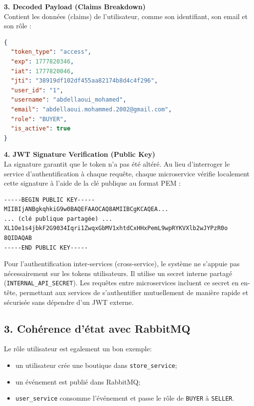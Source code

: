 \documentclass[11pt,a4paper]{article}
\begin{document}
\noindent\textbf{3. Decoded Payload (Claims Breakdown)} \\
Contient les données (claims) de l'utilisateur, comme son identifiant, son email et son rôle :
\begin{lstlisting}[language=json]
{
  "token_type": "access",
  "exp": 1777820346,
  "iat": 1777820046,
  "jti": "38919df102df455aa82174b8d4c4f296",
  "user_id": "1",
  "username": "abdellaoui_mohamed",
  "email": "abdellaoui.mohammed.2002@gmail.com",
  "role": "BUYER",
  "is_active": true
}
\end{lstlisting}

\noindent\textbf{4. JWT Signature Verification (Public Key)} \\
La signature garantit que le token n'a pas été altéré. Au lieu d'interroger le service d'authentification à chaque requête, chaque microservice vérifie localement cette signature à l'aide de la clé publique au format PEM :
\begin{verbatim}
-----BEGIN PUBLIC KEY-----
MIIBIjANBgkqhkiG9w0BAQEFAAOCAQ8AMIIBCgKCAQEA...
... (clé publique partagée) ...
XL1Oe1s4jbkF2G9034Iqri1ZwqxGbMV1xhtdCxHHxPemL9wpRYKVXlb2wJYPzR0o
8QIDAQAB
-----END PUBLIC KEY-----
\end{verbatim}

Pour l'authentification inter-services (cross-service), le système ne s'appuie pas nécessairement sur les tokens utilisateurs. Il utilise un secret interne partagé (\texttt{INTERNAL\_API\_SECRET}). Les requêtes entre microservices incluent ce secret en en-tête, permettant aux services de s'authentifier mutuellement de manière rapide et sécurisée sans dépendre d'un JWT externe.

\subsection{3. Coh\'erence d'\'etat avec RabbitMQ}

Le r\^ole utilisateur est egalement un bon exemple:
\begin{itemize}
  \item un utilisateur cr\'ee une boutique dans \texttt{store\_service};
  \item un \'ev\'enement est publi\'e dans RabbitMQ;
  \item \texttt{user\_service} consomme l'\'ev\'enement et passe le r\^ole de \texttt{BUYER} \`a \texttt{SELLER}.
\end{itemize}
\end{document}
